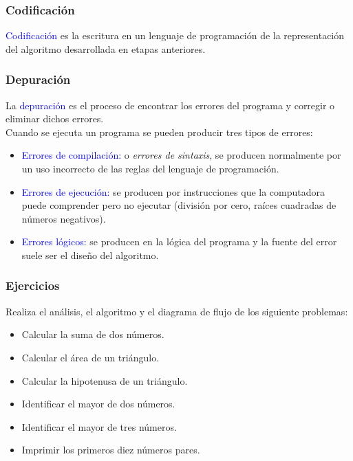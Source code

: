 \begin{frame}[t]
\frametitle{Codificación}
\textcolor{blue}{Codificación} es la escritura en un lenguaje de programación de la representación del algoritmo desarrollada en etapas anteriores.
\end{frame}

\begin{frame}[t]
\frametitle{Depuración}
La \textcolor{blue}{depuración} es el proceso de encontrar los errores del programa y corregir o eliminar dichos errores.\\
Cuando se ejecuta un programa se pueden producir tres tipos de errores:
\begin{itemize}
    \item \textcolor{blue}{Errores de compilación:} o \textit{errores de sintaxis}, se producen normalmente por un uso incorrecto de las reglas del lenguaje de programación. \pause
    \item \textcolor{blue}{Errores de ejecución:} se producen por instrucciones que la computadora puede comprender pero no ejecutar (división por cero, raíces cuadradas de números negativos). \pause
    \item \textcolor{blue}{Errores lógicos:} se producen en la lógica del programa y la fuente del error suele ser el diseño del algoritmo.
\end{itemize}
\end{frame}


\begin{frame}[t]
\frametitle{Ejercicios}
Realiza el análisis, el algoritmo y el diagrama de flujo de los siguiente problemas:
\begin{itemize}
    \item Calcular la suma de dos números.
    \item Calcular el área de un triángulo.
    \item Calcular la hipotenusa de un triángulo.
    \item Identificar el mayor de dos números.
    \item Identificar el mayor de tres números.
    \item Imprimir los primeros diez números pares.
\end{itemize}
\end{frame}



